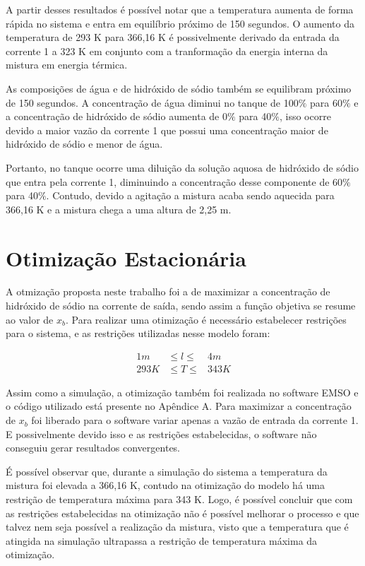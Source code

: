 \documentclass[
	12pt,				%
	openright,			%
	oneside,			%
	a4paper,			%
	english,			%
	french,				%
	spanish,			%
	brazil				%
	]{abntex2}
\begin{document}
A partir desses resultados é possível notar que a temperatura aumenta de forma rápida no sistema e entra em equilíbrio próximo de 150 segundos. O aumento da temperatura de 293 K para 366,16 K é possivelmente derivado da entrada da corrente 1 a 323 K em conjunto com a tranformação da energia interna da mistura em energia térmica.

As composições de água e de hidróxido de sódio também se equilibram próximo de 150 segundos. A concentração de água diminui no tanque de 100$\%$ para 60$\%$ e a concentração de hidróxido de sódio aumenta de 0$\%$ para 40$\%$, isso ocorre devido a maior vazão da corrente 1 que possui uma concentração maior de hidróxido de sódio e menor de água. 

Portanto, no tanque ocorre uma diluição da solução aquosa de hidróxido de sódio que entra pela corrente 1, diminuindo a concentração desse componente de 60$\%$ para 40$\%$. Contudo, devido a agitação a mistura acaba sendo aquecida para 366,16 K e a mistura chega a uma altura de 2,25 m.

\newpage
\chapter{Otimização Estacionária}
\pagestyle{fancy}

A otmização proposta neste trabalho foi a de maximizar a concentração de hidróxido de sódio na corrente de saída, sendo assim a função objetiva se resume ao valor de $x_{b}$. Para realizar uma otimização é necessário estabelecer restrições para o sistema, e as restrições utilizadas nesse modelo foram:

\begin{eqnarray}
1 m &\leq l \leq &4 m\\
293 K &\leq T \leq &343 K
\end{eqnarray}

Assim como a simulação, a otimização também foi realizada no software EMSO e o código utilizado está presente no Apêndice A. Para maximizar a concentração de $x_{b}$ foi liberado para o software variar apenas a vazão de entrada da corrente 1. E possivelmente devido isso e as restrições estabelecidas, o software não conseguiu gerar resultados convergentes. 

É possível observar que, durante a simulação do sistema a temperatura da mistura foi elevada a 366,16 K, contudo na otimização do modelo há uma restrição de temperatura máxima para 343 K. Logo, é possível concluir que com as restrições estabelecidas na otimização não é possível melhorar o processo e que talvez nem seja possível a realização da mistura, visto que a temperatura que é atingida na simulação ultrapassa a restrição de temperatura máxima da otimização.
\end{document}
